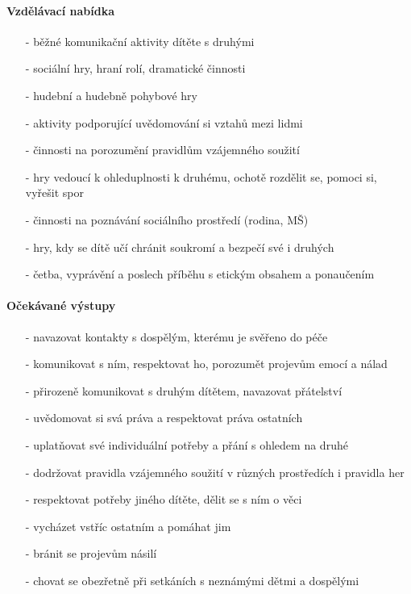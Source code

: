 					\paragraph{Vzdělávací nabídka}

					\begin{itemize}
					\setlength\itemsep{-2mm}
						\item[-]běžné komunikační aktivity dítěte s druhými
						\item[-]sociální hry, hraní rolí, dramatické činnosti
						\item[-]hudební a hudebně pohybové hry
						\item[-]aktivity podporující uvědomování si vztahů mezi lidmi
						\item[-]činnosti na porozumění pravidlům vzájemného soužití
						\item[-]hry vedoucí k ohleduplnosti k druhému, ochotě rozdělit se, pomoci si, vyřešit spor
						\item[-]činnosti na poznávání sociálního prostředí (rodina, MŠ)
						\item[-]hry, kdy se dítě učí chránit soukromí a bezpečí své i druhých
						\item[-]četba, vyprávění a poslech příběhu s etickým obsahem a ponaučením
					\end{itemize}
					
					\paragraph{Očekávané výstupy}

					\begin{itemize}
					\setlength\itemsep{-2mm}
						\item[-]navazovat kontakty s dospělým, kterému je svěřeno do péče
						\item[-]komunikovat s ním, respektovat ho, porozumět projevům emocí a nálad
						\item[-]přirozeně komunikovat s druhým dítětem, navazovat přátelství
						\item[-]uvědomovat si svá práva a respektovat práva ostatních
						\item[-]uplatňovat své individuální potřeby a přání s ohledem na druhé
						\item[-]dodržovat pravidla vzájemného soužití v různých prostředích i pravidla her
						\item[-]respektovat potřeby jiného dítěte, dělit se s ním o věci
						\item[-]vycházet vstříc ostatním a pomáhat jim
						\item[-]bránit se projevům násilí
						\item[-]chovat se obezřetně při setkáních s neznámými dětmi a dospělými
					\end{itemize}

